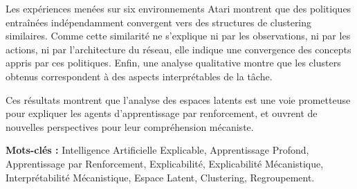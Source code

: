 Les expériences menées sur six environnements Atari montrent que des politiques entraînées indépendamment convergent vers des structures de clustering similaires.
Comme cette similarité ne s'explique ni par les observations, ni par les actions, ni par l'architecture du réseau, elle indique une convergence des concepts appris par ces politiques.
Enfin, une analyse qualitative montre que les clusters obtenus correspondent à des aspects interprétables de la tâche.

Ces résultats montrent que l'analyse des espaces latents est une voie prometteuse pour expliquer les agents d'apprentissage par renforcement, et ouvrent de nouvelles perspectives pour leur compréhension mécaniste.

\bigskip
\noindent\textbf{Mots-clés :} Intelligence Artificielle Explicable, Apprentissage Profond, Apprentissage par Renforcement, Explicabilité, Explicabilité Mécanistique, Interprétabilité Mécanistique, Espace Latent, Clustering, Regroupement.
